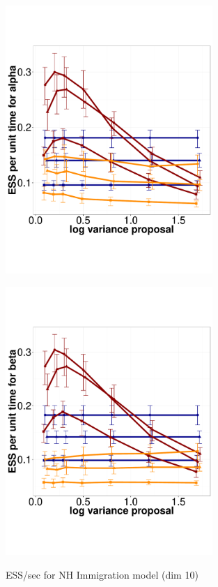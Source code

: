   \begin{figure}%
  \centering
  \begin{minipage}[!hp]{0.45\linewidth}
  \centering
    \includegraphics [width=0.70\textwidth, angle=0]{figs/pc_10_alpha.pdf}
      \end{minipage}
  \begin{minipage}[!hp]{0.45\linewidth}
  \centering
    \includegraphics [width=0.70\textwidth, angle=0]{figs/pc_10_beta.pdf}
    \vspace{-0 in}
     \label{fig:ESS_Q_10}
  \end{minipage}
    \caption{ESS/sec for NH Immigration model (dim 10)}
  \end{figure}
